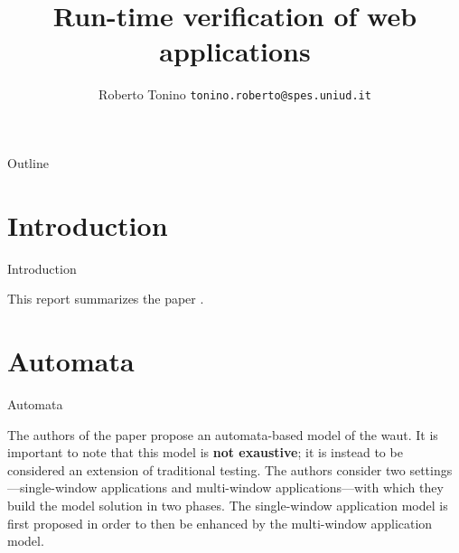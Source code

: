 \documentclass[usenames,dvipsnames]{beamer}
\title{Run-time verification of web applications}
\author[Roberto Tonino]{
  Roberto Tonino
  \pdfnewline
  \texttt{tonino.roberto@spes.uniud.it}
}
\institute{\tiny Department of Mathematics, Computer Science and Physics, University of Udine}
\begin{document}
\begin{frame}
\titlepage
\end{frame}

\begin{frame}{Outline}
\tableofcontents
\end{frame}








\section{Introduction}
\begin{frame}{Introduction}

This report summarizes the paper .
\end{frame}


\section{Automata}
\begin{frame}{Automata}

  The authors of the paper propose an automata-based model of the \gls{waut}. It is important to note that this model is \textbf{not exaustive}; it is instead to be considered an extension of traditional testing. The authors consider two settings---single-window applications and multi-window applications---with which they build the model solution in two phases. The single-window application model is first proposed in order to then be enhanced by the multi-window application model.

\end{frame}
\end{document}

